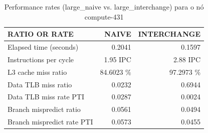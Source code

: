 \documentclass[conference,compsoc]{IEEEtran}
\begin{document}
    \begin{table}[H]
    \caption{Performance rates (large\_naive vs. large\_interchange) para o nó compute-431}
    \label{table:search_rates_large}
    \centering
    \begin{tabular}{ | l | r | r |   }

    \hline
    RATIO OR RATE		 & NAIVE  & INTERCHANGE \\ \hline 
    Elapsed time (seconds) & 0.2041 & 0.1597   \\ \hline      

    Instructions per cycle  & 1.95  IPC & 2.88 IPC       \\ \hline      


    L3 cache miss ratio	  & 84.6023 \%   &    97.2973 \%   \\ \hline      



    Data TLB miss ratio	 &    0.0232 &   0.6944     \\ \hline      

  Data TLB miss rate PTI	 &   0.0287 &       0.0024    \\ \hline      

  Branch mispredict ratio	 & 0.0561   &     0.0494  \\ \hline      


  Branch mispredict rate PTI	 &      0.0573   &       0.0455    \\ \hline          

  \end{tabular}
  \end{table}
\end{document}
